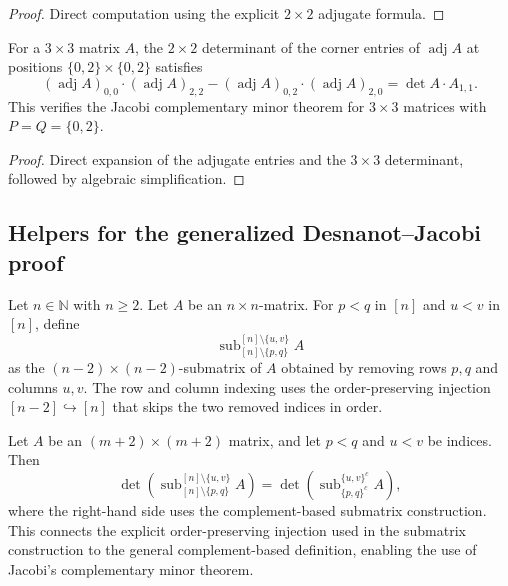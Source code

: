 \begin{proof}
\leanok
Direct computation using the explicit $2 \times 2$ adjugate formula.
\end{proof}

\begin{lemma}
\label{lem.det.jacobi-complement-2x2-three}
\leanhelper
\leanok
For a $3 \times 3$ matrix $A$, the $2 \times 2$ determinant of the corner
entries of $\operatorname{adj} A$ at positions $\{0, 2\} \times \{0, 2\}$ satisfies
\[
  (\operatorname{adj} A)_{0,0} \cdot (\operatorname{adj} A)_{2,2}
  - (\operatorname{adj} A)_{0,2} \cdot (\operatorname{adj} A)_{2,0}
  = \det A \cdot A_{1,1}.
\]
This verifies the Jacobi complementary minor theorem for $3 \times 3$
matrices with $P = Q = \{0, 2\}$.
\end{lemma}

\begin{proof}
\leanok
Direct expansion of the adjugate entries and the $3 \times 3$ determinant,
followed by algebraic simplification.
\end{proof}

\subsection{Helpers for the generalized Desnanot--Jacobi proof}

\begin{convention}
\label{conv.det.submatrixRemove2}
\leanok
Let $n \in \mathbb{N}$ with $n \geq 2$. Let $A$ be an $n \times n$-matrix.
For $p < q$ in $[n]$ and $u < v$ in $[n]$, define
\[
  \operatorname{sub}_{[n] \setminus \{p,q\}}^{[n] \setminus \{u,v\}} A
\]
as the $(n-2) \times (n-2)$-submatrix of $A$ obtained by removing rows $p, q$
and columns $u, v$. The row and column indexing uses
the order-preserving injection $[n-2] \hookrightarrow [n]$
that skips the two removed indices in order.
\end{convention}

\begin{lemma}
\label{lem.det.submatrixRemove2-eq-submatrixDet}
\leanhelper
\leanok
Let $A$ be an $(m+2) \times (m+2)$ matrix, and let $p < q$ and $u < v$ be
indices. Then
\[
  \det\!\left(\operatorname{sub}_{[n]\setminus\{p,q\}}^{[n]\setminus\{u,v\}} A\right)
  = \det\!\left(\operatorname{sub}_{\{p,q\}^c}^{\{u,v\}^c} A\right),
\]
where the right-hand side uses the complement-based submatrix construction.
This connects the explicit order-preserving injection used in the submatrix
construction to the general complement-based definition, enabling the
use of Jacobi's complementary minor theorem.
\end{lemma}

